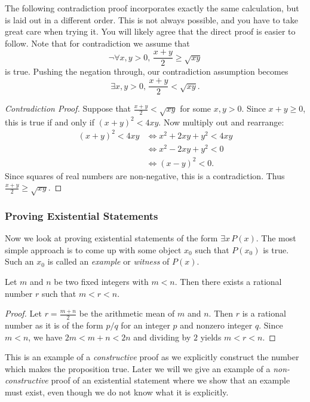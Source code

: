 \noindent The following contradiction proof incorporates exactly the same calculation, but is laid out in a different order. This is not always possible, and you have to take great care when trying it. You will likely agree that the direct proof is easier to follow. Note that for contradiction we assume that 
\[
\neg \forall x,y > 0, \, \frac{x + y}{2} \geq \sqrt{xy}
\]
is true. Pushing the negation through, our contradiction assumption becomes
\[
\exists x,y > 0, \, \frac{x + y}{2} < \sqrt{xy}.
\]

\begin{proof}[Contradiction Proof]
Suppose that $\frac{x+y}{2}<\sqrt{xy}$ for some $x,y > 0$. Since $x+y\ge 0$, this is true if and only if $(x+y)^2<4xy$. Now multiply out and rearrange:
\begin{align*}
(x+y)^2<4xy&\iff x^2+2xy+y^2<4xy\\
&\iff x^2-2xy+y^2<0\\
&\iff (x-y)^2<0.
\end{align*}
Since squares of real numbers are non-negative, this is a contradiction. Thus $\frac{x+y}{2}\ge \sqrt{xy}$.
\end{proof}

\subsubsection*{Proving Existential Statements}

Now we look at proving existential statements of the form $\exists x \, P(x)$. The most simple approach is to come up with some object $x_0$ such that $P(x_0)$ is true. Such an $x_0$ is called an \emph{example} or \emph{witness} of $P(x)$.

\begin{thm}
    Let $m$ and $n$ be two fixed integers with $m < n$. Then there exists a rational number $r$ such that $m < r < n$.
\end{thm}

\begin{proof}
    Let $r = \frac{m + n}{2}$ be the arithmetic mean of $m$ and $n$. Then $r$ is a rational number as it is of the form $p/q$ for an integer $p$ and nonzero integer $q$. Since $m < n$, we have $2m < m + n < 2n$ and dividing by $2$ yields $m < r < n$. 
\end{proof}

\noindent This is an example of a \emph{constructive} proof as we explicitly construct the number which makes the proposition true. Later we will we give an example of a \emph{non-constructive} proof of an existential statement where we show that an example must exist, even though we do not know what it is explicitly.

